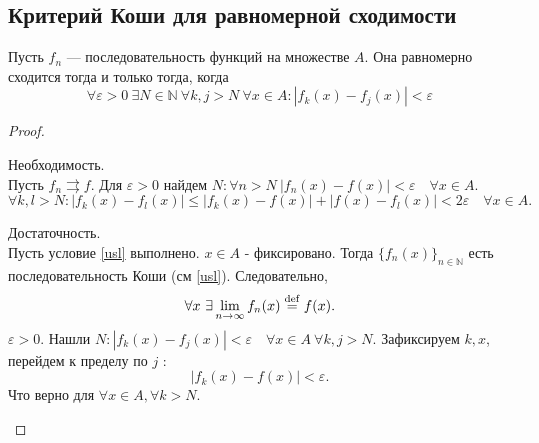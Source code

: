 \documentclass[11pt]{book}
\newcommand{\N}{\mathbb{N}}
\renewcommand{\le}{\leqslant}
\def\mydef{\mathrel{\stackrel{\rm def}=}}
\theoremstyle{definition}
\theoremstyle{plain}
\theoremstyle{plain}
\theoremstyle{definition}
\theoremstyle{remark}
\begin{document}
\subsection{Критерий Коши для равномерной сходимости}
\begin{thm}
    Пусть $f_n$ --- последовательность функций на множестве $A$. Она равномерно сходится  тогда и только тогда, когда
    \begin{equation}
	\label{usl}
	\forall  \varepsilon >0~ \exists  N \in \N~ \forall  k, j> N~ \forall x \in A : |f_k(x) - f_j(x)| < \varepsilon
    \end{equation}
\end{thm}
\begin{proof}
    $ $
    \begin{description}
	\item Необходимость.\\
    Пусть $f_n \rightrightarrows  f$. Для $\varepsilon  >0$ найдем $N: \forall  n > N ~ |f_n(x) - f(x)| < \varepsilon \quad \forall x\in A$.
    \[
	\forall k, l > N : |f_k(x) - f_l(x)| \le |f_k(x) -f(x)| + |f(x) - f_l(x)| < 2 \varepsilon \quad  \forall x \in A
    .\]
\item Достаточность.\\
    Пусть  условие \ref{usl} выполнено. $x \in A$ - фиксировано.
    Тогда $\{f_n(x)\}_{n \in  \N}$ есть последовательность Коши (см \ref{usl}). Следовательно,
    \[
	\forall  x~ \exists \lim_{n \to  \infty} f_n(x) \mydef  f(x)
    .\]
    $ \varepsilon  >0$. Нашли $N: |f_k(x) - f_j(x)| < \varepsilon  \quad \forall  x \in A ~ \forall  k, j > N$.
    Зафиксируем $k, x$, перейдем к пределу по $j$ :
    \[
	|f_k(x) - f(x) | < \varepsilon
    .\]
    Что верно для $ \forall  x \in  A, \forall  k > N$.
    \end{description}
\end{proof}
\end{document}
